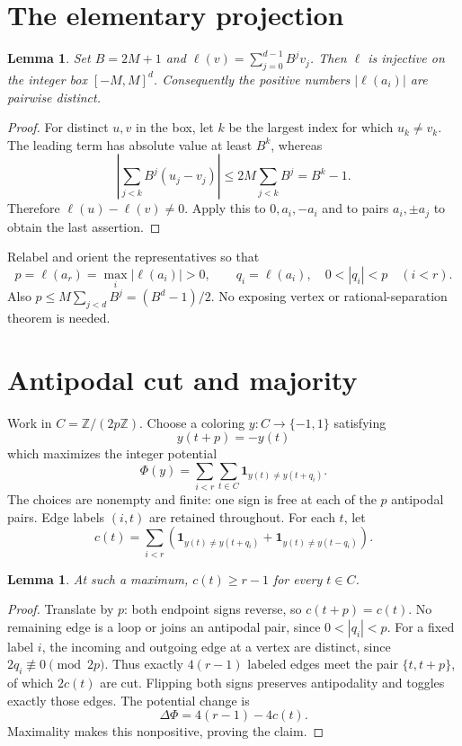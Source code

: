 \documentclass[11pt]{article}
\newtheorem{lemma}[theorem]{Lemma}
\newcommand{\Z}{\mathbb Z}
\begin{document}
\section{The elementary projection}
\begin{lemma}\label{lem:encode}
Set $B=2M+1$ and
$\ell(v)=\sum_{j=0}^{d-1} B^j v_j$.
Then $\ell$ is injective on the integer box $[-M,M]^d$.
Consequently the positive numbers $|\ell(a_i)|$ are pairwise distinct.
\end{lemma}
\begin{proof}
For distinct $u,v$ in the box, let $k$ be the largest index for which
$u_k\ne v_k$. The leading term has absolute value at least $B^k$, whereas
\[
 \left|\sum_{j<k}B^j(u_j-v_j)\right|
 \le 2M\sum_{j<k}B^j=B^k-1.
\]
Therefore $\ell(u)-\ell(v)\ne0$. Apply this to $0,a_i,-a_i$ and
to pairs $a_i,\pm a_j$ to obtain the last assertion.
\end{proof}

Relabel and orient the representatives so that
\[
 p=\ell(a_r)=\max_i|\ell(a_i)|>0,
 \qquad q_i=\ell(a_i),\quad 0<|q_i|<p\quad(i<r).
\]
Also $p\le M\sum_{j<d}B^j=(B^d-1)/2$. No exposing vertex or
rational-separation theorem is needed.

\section{Antipodal cut and majority}
Work in $C=\Z/(2p\Z)$. Choose a coloring $y:C\to\{-1,1\}$ satisfying
\[
                 y(t+p)=-y(t)
\]
which maximizes the integer potential
\[
 \Phi(y)=\sum_{i<r}\sum_{t\in C}
                    \mathbf 1_{y(t)\ne y(t+q_i)}.
\]
The choices are nonempty and finite: one sign is free at each of the $p$
antipodal pairs. Edge labels $(i,t)$ are retained throughout.
For each $t$, let
\[
 c(t)=\sum_{i<r}\left(
  \mathbf 1_{y(t)\ne y(t+q_i)}+
  \mathbf 1_{y(t)\ne y(t-q_i)}\right).
\]

\begin{lemma}\label{lem:flip}
At such a maximum, $c(t)\ge r-1$ for every $t\in C$.
\end{lemma}
\begin{proof}
Translate by $p$: both endpoint signs reverse, so $c(t+p)=c(t)$.
No remaining edge is a loop or joins an antipodal pair, since
$0<|q_i|<p$. For a fixed label $i$, the incoming and outgoing edge at a
vertex are distinct, since $2q_i\not\equiv0\pmod{2p}$.
Thus exactly $4(r-1)$ labeled edges meet the pair $\{t,t+p\}$, of which
$2c(t)$ are cut. Flipping both signs preserves antipodality and toggles
exactly those edges. The potential change is
\[
       \Delta\Phi=4(r-1)-4c(t).
\]
Maximality makes this nonpositive, proving the claim.
\end{proof}
\end{document}
